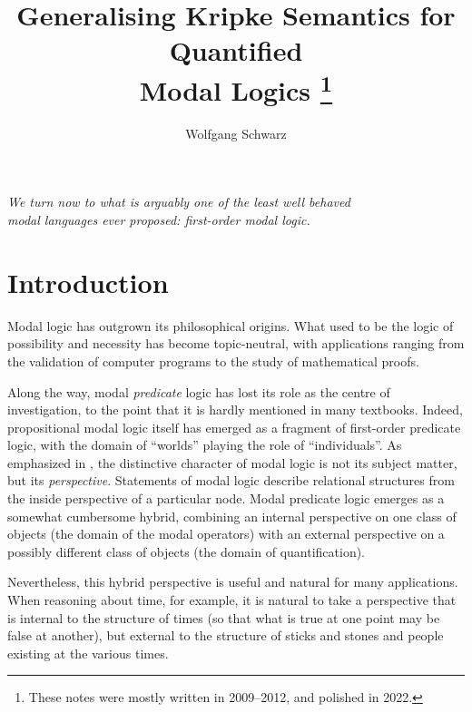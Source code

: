\documentclass[11pt]{woarticle}
\theoremstyle{break}
\theoremstyle{nonumberplain}
\newcommand{\1}{\;\,|\;\,}
\begin{document}
\title{Generalising Kripke Semantics for Quantified\\[2mm]
  Modal Logics%
  \thanks{%
    These notes were mostly written in 2009--2012, and polished in 2022.
  }%
}

\author{Wolfgang Schwarz%
}

\date{}

\maketitle

\begin{flushright}

\emph{We turn now to what is arguably one of the least well behaved\\
modal languages ever proposed: first-order modal logic.}

\cite{blackburn07modal}

\end{flushright}

\tableofcontents

\section{Introduction}\label{sec:intro}

Modal logic has outgrown its philosophical origins. What used to be the logic of
possibility and necessity has become topic-neutral, with applications ranging
from the validation of computer programs to the study of mathematical proofs.

Along the way, modal \emph{predicate} logic has lost its role as the centre of
investigation, to the point that it is hardly mentioned in many textbooks.
Indeed, propositional modal logic itself has emerged as a fragment of
first-order predicate logic, with the domain of ``worlds'' playing the role of
``individuals''. As emphasized in \cite{blackburn01modal}, the distinctive
character of modal logic is not its subject matter, but its \emph{perspective}.
Statements of modal logic describe relational structures from the inside
perspective of a particular node. Modal predicate logic emerges as a somewhat
cumbersome hybrid, combining an internal perspective on one class of objects
(the domain of the modal operators) with an external perspective on a possibly
different class of objects (the domain of quantification).

Nevertheless, this hybrid perspective is useful and natural for many
applications. When reasoning about time, for example, it is natural to take a
perspective that is internal to the structure of times (so that what is true at
one point may be false at another), but external to the structure of sticks and
stones and people existing at the various times.
\end{document}

